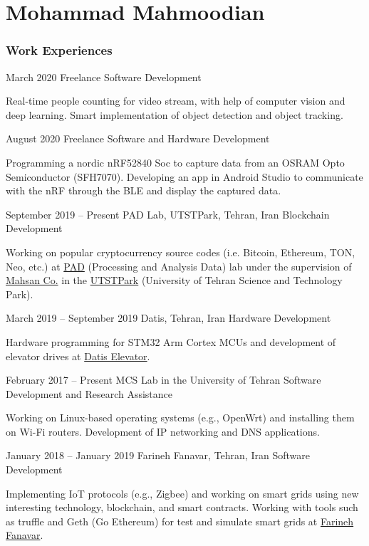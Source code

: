 \documentclass{tccv}
\begin{document}
\part{Mohammad Mahmoodian}

\section{Work Experiences}

\begin{eventlist}

\item{March 2020}
{Freelance}
{Software Development}

Real-time people counting for video stream, with help of computer vision and deep learning. Smart implementation of object detection and object tracking.

\item{August 2020}
{Freelance}
{Software and Hardware Development}

Programming a nordic nRF52840 Soc to capture data from an OSRAM Opto Semiconductor (SFH7070). Developing an app in Android Studio to communicate with the nRF through the BLE and display the captured data.

\item{September 2019 -- Present}
     {PAD Lab, UTSTPark, Tehran, Iran}
     {Blockchain Development}
     
Working on popular cryptocurrency source codes (i.e. Bitcoin, Ethereum, TON, Neo, etc.) at \href{www.padlab.ir}{PAD} (Processing and Analysis Data) lab under the supervision of \href{www.mahsan.co}{Mahsan Co.} in the \href{www.utstpark.ir}{UTSTPark} (University of Tehran Science and Technology Park).

\item{March 2019 -- September 2019}
     {Datis, Tehran, Iran}
     {Hardware Development}

Hardware programming for STM32 Arm Cortex MCUs and development of elevator drives at \href{www.datis-elevator.ir}{Datis Elevator}.

\item{February 2017 -- Present}
     {MCS Lab in the University of Tehran}
     {Software Development and Research Assistance}

Working on Linux-based operating systems (e.g., OpenWrt) and installing them on Wi-Fi routers.
Development of IP networking and DNS applications.

\item{January 2018 -- January 2019}
     {Farineh Fanavar, Tehran, Iran}
     {Software Development}

Implementing IoT protocols (e.g., Zigbee) and working on smart grids using new interesting technology, blockchain, and smart contracts. Working with tools such as truffle and Geth (Go Ethereum) for test and simulate smart grids at \href{http://farinehtech.com/}{Farineh Fanavar}.

\end{eventlist}
\end{document}
